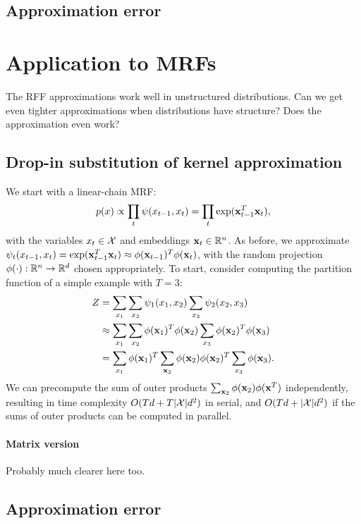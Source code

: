 \documentclass{article}
\begin{document}
\subsection{Approximation error}

\section{Application to MRFs}
The RFF approximations work well in unstructured distributions.
Can we get even tighter approximations when distributions have structure?
Does the approximation even work?

\subsection{Drop-in substitution of kernel approximation}
We start with a linear-chain MRF:
$$p(x) \propto \prod_t \psi(x_{t-1},x_t) = \prod_t \exp(\mathbf{x}_{t-1}^T\mathbf{x}_t),$$
with the variables $x_t\in\mathcal{X}$ and embeddings $\mathbf{x}_t\in\mathbb{R}^n$.
As before, we approximate $\psi_t(x_{t-1}, x_t) = \exp(\mathbf{x}_{t-1}^T \mathbf{x}_t) \approx \phi(\mathbf{x}_{t-1})^T\phi(\mathbf{x}_t)$,
with the random projection $\phi(\cdot): \mathbb{R}^n \to \mathbb{R}^d$ chosen appropriately.
To start, consider computing the partition function of a simple example with $T=3$:
\begin{equation}
\begin{aligned}
Z
&= \sum_{x_1}\sum_{x_2} \psi_1(x_1, x_2) \sum_{x_3} \psi_2(x_2, x_3) \\
&\approx \sum_{x_1}\sum_{x_2} \phi(\mathbf{x}_1)^T\phi(\mathbf{x}_2) \sum_{x_3} \phi(\mathbf{x}_2)^T\phi(\mathbf{x}_3)\\
&= \sum_{x_1} \phi(\mathbf{x}_1)^T \sum_{\mathbf{x}_2} \phi(\mathbf{x}_2)\phi(\mathbf{x}_2)^T \sum_{x_3}\phi(\mathbf{x}_3).
\end{aligned}
\end{equation}
We can precompute the sum of outer products $\sum_{\mathbf{x}_2}\phi(\mathbf{x}_2)\phi(\mathbf{x}^T)$ independently,
resulting in time complexity $O(Td + T|\mathcal{X}|d^2)$ in serial,
and $O(Td + |\mathcal{X}|d^2)$ if the sums of outer products can be computed in parallel.

\paragraph{Matrix version}
Probably much clearer here too.

\subsection{Approximation error}




\end{document}
